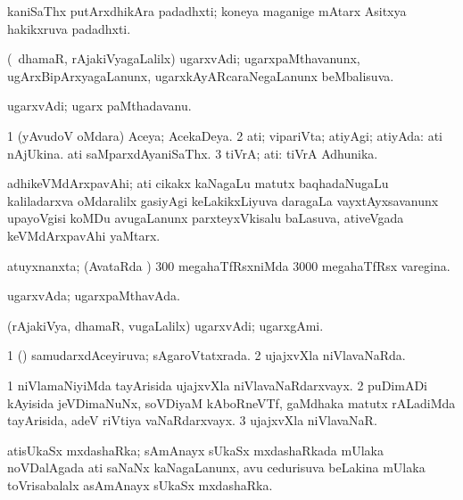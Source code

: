 \bentry
{} 
\gl{\nA}
\expl{}
\bmng
kaniSaThx putArxdhikAra padadhxti; koneya maganige mAtarx Asitxya hakikxruva padadhxti. 
\emng
\eentry

\bentry
{} 
\gl{\gu}
\expl{}
\bmng
(\kanmu\ dhamaR, rAjakiVyagaLalilx) ugarxvAdi; ugarxpaMthavanunx, ugArxBipArxyagaLanunx, ugarxkAyARcaraNegaLanunx beMbalisuva. 
\emng
\eentry

\bentry
{} 
\gl{\nA}
\expl{}
\bmng
ugarxvAdi; ugarx paMthadavanu. 
\emng
\eentry

\bentry
{} 
\gl{\sapUpa}
\expl{}
\bmng
\bnum
\num{1} (yAvudoV oMdara) Aceya; AcekaDeya. 
\num{2} ati; vipariVta; atiyAgi; atiyAda:  ati nAjUkina.  ati saMparxdAyaniSaThx. 
\num{3} tiVrA; ati:  tiVrA Adhunika. 
\enum
\emng
\eentry

\bentry
{} 
\gl{\nA}
\expl{}
\bmng
adhikeVMdArxpavAhi; ati cikakx kaNagaLu matutx baqhadaNugaLu kaliladarxva oMdaralilx gasiyAgi keLakikxLiyuva daragaLa vayxtAyxsavanunx upayoVgisi koMDu avugaLanunx parxteyxVkisalu baLasuva, ativeVgada keVMdArxpavAhi yaMtarx. 
\emng
\eentry

\bentry
{} 
\gl{\gu}
\bmng
atuyxnanxta; (AvataRda \vi) 300 megahaTfRsxniMda 3000 megahaTfRsx varegina. 
\emng
\eentry

\bentry
{} 
\gl{\nA}
\expl{}
\bmng
ugarxvAda; ugarxpaMthavAda. 
\emng
\eentry

\bentry
{} 
\gl{\nA}
\expl{}
\bmng
(rAjakiVya, dhamaR, \mo vugaLalilx) ugarxvAdi; ugarxgAmi. 
\emng
\eentry

\bentry
{} 
\gl{\gu}
\expl{}
\bmng
\bnum
\num{1} (\pArxparx) samudarxdAceyiruva; sAgaroVtatxrada. 
\num{2} ujajxvXla niVlavaNaRda. 
\enum
\emng
\eentry

\bentry
{} 
\gl{\nA}
\expl{}
\bmng
\bnum
\num{1} niVlamaNiyiMda tayArisida ujajxvXla niVlavaNaRdarxvayx. 
\num{2} puDimADi kAyisida jeVDimaNuNx, soVDiyaM kAboRneVTf, gaMdhaka matutx rALadiMda tayArisida, adeV riVtiya vaNaRdarxvayx. 
\num{3} ujajxvXla niVlavaNaR. 
\enum
\emng
\eentry

\bentry
{} 
\gl{\nA}
\expl{}
\bmng
atisUkaSx mxdashaRka; sAmAnayx sUkaSx mxdashaRkada mUlaka noVDalAgada ati saNaNx kaNagaLanunx, avu cedurisuva beLakina mUlaka toVrisabalalx asAmAnayx sUkaSx mxdashaRka. 
\emng
\eentry

